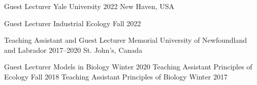 

\begin{cventries}

  \cventry
    {Guest Lecturer} %
    {Yale University} %
    {2022} %
    {New Haven, USA} %
    {
      \begin{cvsubentries}
       \cvsubentry
         {Guest Lecturer}
         {\footnotesize Industrial Ecology}
         {Fall 2022}
         {
         }
      \end{cvsubentries}
    }

  \cventry
    {Teaching Assistant and Guest Lecturer} %
    {Memorial University of Newfoundland and Labrador} %
    {2017--2020} %
    {St. John's, Canada} %
    {
      \begin{cvsubentries}
       \cvsubentry
         {Guest Lecturer}
         {\footnotesize Models in Biology}
         {Winter 2020}
         {
         }
       \cvsubentry
         {Teaching Assistant}
         {\footnotesize Principles of Ecology}
         {Fall 2018}
         {
         }
       \cvsubentry
         {Teaching Assistant}
         {\footnotesize Principles of Biology}
         {Winter 2017}
         {
         }
      \end{cvsubentries}
    }


\end{cventries}
